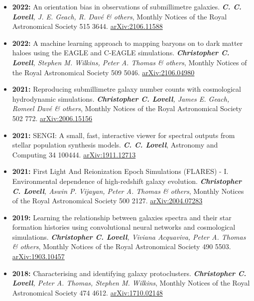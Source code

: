 \begin{itemize}
\item \textbf{2022:} An orientation bias in observations of submillimetre galaxies. \textit{\textbf{C. C. Lovell}, J. E. Geach, R. Davé \& others}, Monthly Notices of the Royal Astronomical Society 515 3644. \href{https://arxiv.org/abs/2106.11588}{arXiv:2106.11588}
\item \textbf{2022:} A machine learning approach to mapping baryons on to dark matter haloes using the EAGLE and C-EAGLE simulations. \textit{\textbf{Christopher C. Lovell}, Stephen M. Wilkins, Peter A. Thomas \& others}, Monthly Notices of the Royal Astronomical Society 509 5046. \href{https://arxiv.org/abs/2106.04980}{arXiv:2106.04980}
\item \textbf{2021:} Reproducing submillimetre galaxy number counts with cosmological hydrodynamic simulations. \textit{\textbf{Christopher C. Lovell}, James E. Geach, Romeel Davé \& others}, Monthly Notices of the Royal Astronomical Society 502 772. \href{https://arxiv.org/abs/2006.15156}{arXiv:2006.15156}
\item \textbf{2021:} SENGI: A small, fast, interactive viewer for spectral outputs from stellar population synthesis models. \textit{\textbf{C. C. Lovell}}, Astronomy and Computing 34 100444. \href{https://arxiv.org/abs/1911.12713}{arXiv:1911.12713}
\item \textbf{2021:} First Light And Reionization Epoch Simulations (FLARES) - I. Environmental dependence of high-redshift galaxy evolution. \textit{\textbf{Christopher C. Lovell}, Aswin P. Vijayan, Peter A. Thomas \& others}, Monthly Notices of the Royal Astronomical Society 500 2127. \href{https://arxiv.org/abs/2004.07283}{arXiv:2004.07283}
\item \textbf{2019:} Learning the relationship between galaxies spectra and their star formation histories using convolutional neural networks and cosmological simulations. \textit{\textbf{Christopher C. Lovell}, Viviana Acquaviva, Peter A. Thomas \& others}, Monthly Notices of the Royal Astronomical Society 490 5503. \href{https://arxiv.org/abs/1903.10457}{arXiv:1903.10457}
\item \textbf{2018:} Characterising and identifying galaxy protoclusters. \textit{\textbf{Christopher C. Lovell}, Peter A. Thomas, Stephen M. Wilkins}, Monthly Notices of the Royal Astronomical Society 474 4612. \href{https://arxiv.org/abs/1710.02148}{arXiv:1710.02148}
\end{itemize}

